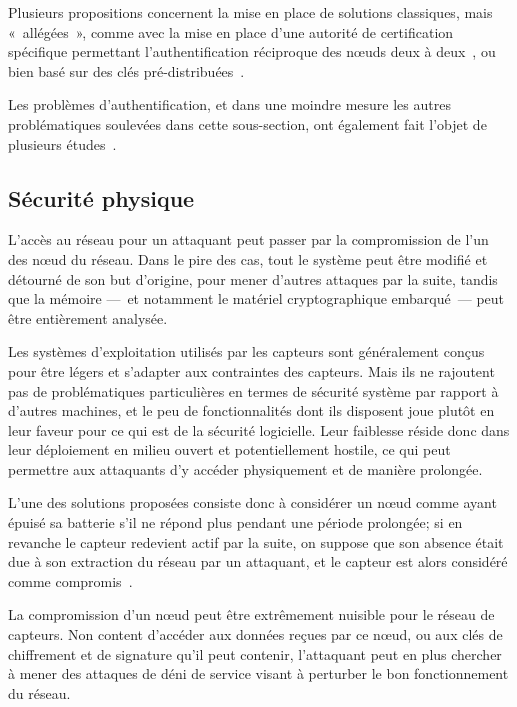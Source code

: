 Plusieurs propositions concernent la mise en place de solutions classiques, mais « allégées », comme avec la mise en place d'une autorité de certification spécifique permettant l'authentification réciproque des nœuds deux à deux~\cite{GWZCK13}, ou bien basé sur des clés pré-distribuées~\cite{BSK13}.

Les problèmes d'authentification, et dans une moindre mesure les autres problématiques soulevées dans cette sous-section, ont également fait l'objet de plusieurs études~\cite{GWZC13}.

\subsection{Sécurité physique}

L'accès au réseau pour un attaquant peut passer par la compromission de l'un des nœud du réseau.
Dans le pire des cas, tout le système peut être modifié et détourné de son but d'origine, pour mener d'autres attaques par la suite, tandis que la mémoire ---~et notamment le matériel cryptographique embarqué~--- peut être entièrement analysée.

Les systèmes d'exploitation utilisés par les capteurs sont généralement conçus pour être légers et s'adapter aux contraintes des capteurs.
Mais ils ne rajoutent pas de problématiques particulières en termes de sécurité système par rapport à d'autres machines, et le peu de fonctionnalités dont ils disposent joue plutôt en leur faveur pour ce qui est de la sécurité logicielle.
Leur faiblesse réside donc dans leur déploiement en milieu ouvert et potentiellement hostile, ce qui peut permettre aux attaquants d'y accéder physiquement et de manière prolongée.

L'une des solutions proposées consiste donc à considérer un nœud comme ayant épuisé sa batterie s'il ne répond plus pendant une période prolongée; si en revanche le capteur redevient actif par la suite, on suppose que son absence était due à son extraction du réseau par un attaquant, et le capteur est alors considéré comme compromis~\cite{Ho10}.

La compromission d'un nœud peut être extrêmement nuisible pour le réseau de capteurs.
Non content d'accéder aux données reçues par ce nœud, ou aux clés de chiffrement et de signature qu'il peut contenir, l'attaquant peut en plus chercher à mener des attaques de déni de service visant à perturber le bon fonctionnement du réseau.
